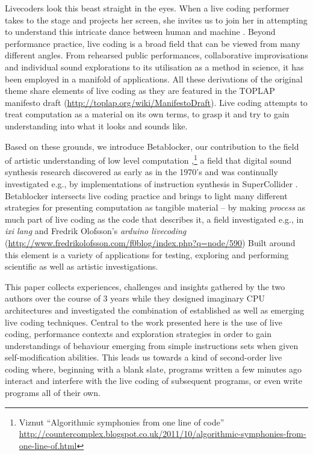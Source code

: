 \documentclass[letterpaper, 12pt]{article}
\begin{document}
Livecoders look this beast straight in the eyes.
When a live coding performer takes to the stage and projects her screen, she invites us to join her in attempting to understand this intricate dance between human and machine \citep{collins2011-liv}.
Beyond performance practice, live coding is a broad field that can be viewed from many different angles.
From rehearsed public performances, collaborative improvisations and individual sound explorations to its utilisation as a method in science, it has been employed in a manifold of applications.
All these derivations of the original theme share elements of live coding as they are featured in the TOPLAP manifesto draft (\url{http://toplap.org/wiki/ManifestoDraft}). \citep{ward2004-liv}
Live coding attempts to treat computation as a material on its own terms, to grasp it and try to gain understanding into what it looks \citep{mclean2010-vis} and sounds like.

Based on these grounds, we introduce Betablocker, our contribution to the field of artistic understanding of low level computation \citep{2006-the},\footnote{Viznut ``Algorithmic symphonies from one line of code'' \url{http://countercomplex.blogspot.co.uk/2011/10/algorithmic-symphonies-from-one-line-of.html}} a field that digital sound synthesis research discovered as early as in the 1970's \citep{berg2009-com} and was continually investigated e.g., by implementations of instruction synthesis in SuperCollider \citep{collins2008-err}.
Betablocker intersects live coding practice and brings to light many different strategies for presenting computation as tangible material -- by making \emph{process} as much part of live coding as the code that describes it, a field investigated e.g., in \emph{ixi lang} \cite{magnusson2011-ixi} and Fredrik Olofsson's \emph{arduino livecoding} (\url{http://www.fredrikolofsson.com/f0blog/index.php?q=node/590})
Built around this element is a variety of applications for testing, exploring and performing scientific as well as artistic investigations.


This paper collects experiences, challenges and insights gathered by the two authors over the course of 3 years while they designed imaginary CPU architectures and investigated the combination of established as well as emerging live coding techniques.
Central to the work presented here is the use of live coding, performance contexts and exploration strategies in order to gain understandings of behaviour emerging from simple instructions sets when given self-modification abilities.
This leads us towards a kind of second-order live coding where, beginning with a blank slate, programs written a few minutes ago interact and interfere with the live coding of subsequent programs, or even write programs all of their own.
\parskip 18pt
\end{document}
